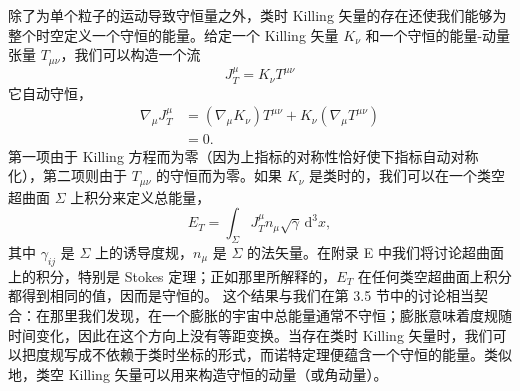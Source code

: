 除了为单个粒子的运动导致守恒量之外，类时 Killing 矢量的存在还使我们能够为整个时空定义一个守恒的能量。给定一个 Killing 矢量 $K_\nu$ 和一个守恒的能量-动量张量 $T_{\mu\nu}$，我们可以构造一个流
\begin{equation*}
J^\mu_T = K_\nu T^{\mu\nu}
\tag{3.179}
\end{equation*}
它自动守恒，
\begin{align*}
\nabla_\mu J^\mu_T &= (\nabla_\mu K_\nu)T^{\mu\nu} + K_\nu(\nabla_\mu T^{\mu\nu})\\
&= 0.
\tag{3.180}
\end{align*}
第一项由于 Killing 方程而为零（因为上指标的对称性恰好使下指标自动对称化），第二项则由于 $T_{\mu\nu}$ 的守恒而为零。如果 $K_\nu$ 是类时的，我们可以在一个类空超曲面 $\Sigma$ 上积分来定义总能量，
\begin{equation*}
E_T = \int_\Sigma J^\mu_T n_\mu \sqrt{\gamma}\,\mathrm{d}^3x,
\tag{3.181}
\end{equation*}
其中 $\gamma_{ij}$ 是 $\Sigma$ 上的诱导度规，$n_\mu$ 是 $\Sigma$ 的法矢量。在附录 E 中我们将讨论超曲面上的积分，特别是 Stokes 定理；正如那里所解释的，$E_T$ 在任何类空超曲面上积分都得到相同的值，因而是守恒的。
这个结果与我们在第 3.5 节中的讨论相当契合：在那里我们发现，在一个膨胀的宇宙中总能量通常不守恒；膨胀意味着度规随时间变化，因此在这个方向上没有等距变换。当存在类时 Killing 矢量时，我们可以把度规写成不依赖于类时坐标的形式，而诺特定理便蕴含一个守恒的能量。类似地，类空 Killing 矢量可以用来构造守恒的动量（或角动量）。

